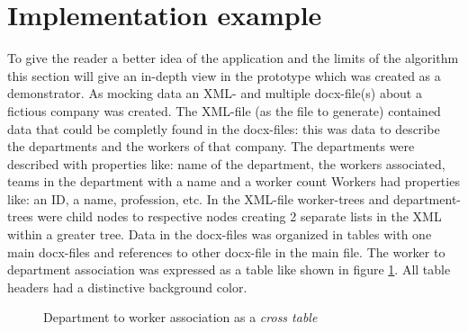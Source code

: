 \documentclass[conference]{IEEEtran}
\begin{document}
\section{Implementation example}
To give the reader a better idea of the application and the limits of the algorithm this section
will give an in-depth view in the prototype which was created as a demonstrator. As mocking
data an XML- and multiple docx-file(s) about a fictious company was created. The XML-file (as
the file to generate) contained data that could be completly found in the docx-files: this was
data to describe the departments and the workers of that company. The departments were described
with properties like:\newline
name of the department, the workers associated, teams in the department with a name and a worker
count\newline
Workers had properties like:
an ID, a name, profession, etc.\newline
In the XML-file worker-trees and department-trees were child nodes to respective nodes creating
2 separate lists in the XML within a greater tree. Data in the docx-files was organized in tables
with one main docx-files and references to other docx-file in the main file. The worker to 
department association was expressed as a table like shown in figure \ref{cross_table}. All
table headers had a distinctive background color.
\begin{figure}[h]
 \centering
 \caption{Department to worker association as a \textit{cross table}}
 \label{cross_table}
\end{figure}
\end{document}

